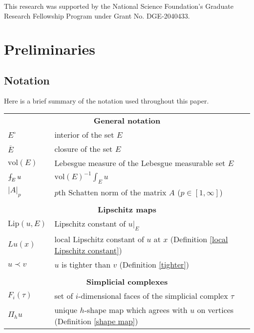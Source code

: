 \documentclass[reqno,11pt]{amsart}
\newcommand{\vol}{\mathrm{vol}}
\newcommand{\Lip}{\mathrm{Lip}}
\theoremstyle{definition}
\numberwithin{equation}{section}
\def\Xint#1{\mathchoice
{\XXint\displaystyle\textstyle{#1}}%
{\XXint\textstyle\scriptstyle{#1}}%
{\XXint\scriptstyle\scriptscriptstyle{#1}}%
{\XXint\scriptscriptstyle\scriptscriptstyle{#1}}%
\!\int}
\def\XXint#1#2#3{{\setbox0=\hbox{$#1{#2#3}{\int}$ }
\vcenter{\hbox{$#2#3$ }}\kern-.6\wd0}}
\def\dashint{\Xint-}
\begin{document}
This research was supported by the National Science Foundation's Graduate Research Fellowship Program under Grant No. DGE-2040433.

\section{Preliminaries}
\subsection{Notation}
Here is a brief summary of the notation used throughout this paper.

\begin{longtable}{@{\extracolsep{\fill}}lp{}}
\multicolumn{2}{c}{\textbf{General notation}}\\[4pt]
$E^\circ$ & interior of the set $E$ \\
$\overline E$ & closure of the set $E$ \\
$\vol(E)$ & Lebesgue measure of the Lebesgue measurable set $E$ \\
$\dashint_E u$ & $\vol(E)^{-1} \int_E u$ \\
$|A|_p$ & $p$th Schatten norm of the matrix $A$ ($p \in [1, \infty]$) \\
\\
\multicolumn{2}{c}{\textbf{Lipschitz maps}}\\[4pt]
$\Lip(u, E)$ & Lipschitz constant of $u|_E$\\
$Lu(x)$ & local Lipschitz constant of $u$ at $x$ (Definition \ref{local Lipschitz constant})\\
$u \prec v$ & $u$ is tighter than $v$ (Definition \ref{tighter})\\
\\
\multicolumn{2}{c}{\textbf{Simplicial complexes}}\\[4pt]
$F_i(\tau)$ & set of $i$-dimensional faces of the simplicial complex $\tau$\\
$\Pi_h u$ & unique $h$-shape map which agrees with $u$ on vertices (Definition \ref{shape map})
\end{longtable}

\end{document}
